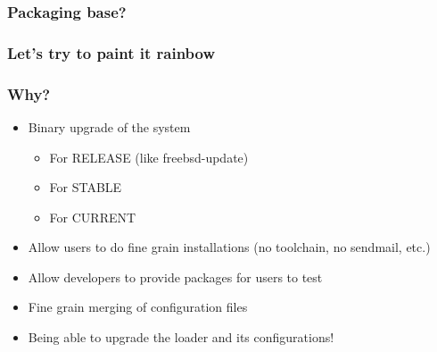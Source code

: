 \begin{frame}
	\frametitle{Packaging base?}
	\pause
	\colorbox{red}{\makebox[\textwidth]{\textcolor{white}{Do not split}}}
	\pause
	\colorbox{orange}{}
	\pause
	\colorbox{yellow}{}
	\pause
	\colorbox{green}{}
	\pause
	\colorbox{blue}{\makebox[\textwidth]{\textcolor{white}{No development file}}}
	\pause
	\colorbox{indigo!75}{\makebox[\textwidth]{\textcolor{white}{No documentation}}}
	\pause
	\colorbox{violet}{\makebox[\textwidth]{\textcolor{white}{I want debug files}}}
\end{frame}

\begin{frame}
	\frametitle{Let's try to paint it rainbow}
	\colorbox{red}{\makebox[\textwidth]{\textcolor{white}{FreeBSD FreeBSD-base FreeBSD-kernel FreeBSD-docs}}}
	\pause
	\colorbox{orange}{}
	\pause
	\colorbox{yellow}{}
	\pause
	\colorbox{green}{}
	\pause
	\colorbox{blue}{\makebox[\textwidth]{\textcolor{white}{runtime separated from development files}}}
	\pause
	\colorbox{indigo!75}{\makebox[\textwidth]{\textcolor{white}{FreeBSD-docs (does not concern manpages)}}}
	\pause
	\colorbox{violet}{\makebox[\textwidth]{\textcolor{white}{-debug packages}}}
\end{frame}

\begin{frame}
	\frametitle{Why?}
	\begin{itemize}
		\item Binary upgrade of the system
			\begin{itemize}
				\item For RELEASE (like freebsd-update)
				\item For STABLE
				\item For CURRENT
			\end{itemize}
		\item Allow users to do fine grain installations (no toolchain, no sendmail, etc.)
		\item Allow developers to provide packages for users to test
		\item Fine grain merging of configuration files
		\item Being able to upgrade the loader and its configurations!
	\end{itemize}
\end{frame}

